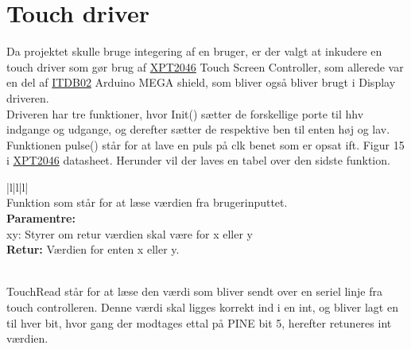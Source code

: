 \graphicspath{{Chapters/Touch/}}


\section{Touch driver}
Da projektet skulle bruge integering af en bruger, er der valgt at inkudere en touch driver som gør brug af \href{https://blackboard.au.dk/bbcswebdav/pid-1762166-dt-content-rid-4251461_1/courses/BB-Cou-UUVA-73302/BB-Cou-UUVA-65758_ImportedContent_20170106021228/BB-Cou-STADS-UUVA-52360_ImportedContent_20160107025559/LAB/LAB10%20Touch%20Screen%20Driver/Files%20for%20LAB10/XPT2046.pdf}{XPT2046}
Touch Screen Controller, som allerede var en del af \href{https://blackboard.au.dk/bbcswebdav/pid-1762173-dt-content-rid-4251448_1/courses/BB-Cou-UUVA-73302/BB-Cou-UUVA-65758_ImportedContent_20170106021228/BB-Cou-STADS-UUVA-52360_ImportedContent_20160107025559/LAB/LAB10%20Touch%20Screen%20Driver/Files%20for%20LAB10/DS_IM120417024_ITDB02ArduinoMEGAShield.pdf}{ITDB02}
Arduino MEGA shield, som bliver også bliver brugt i Display driveren. \\
Driveren har tre funktioner, hvor Init() sætter de forskellige porte til hhv indgange og udgange, og derefter sætter de respektive ben til enten høj og lav. Funktionen pulse() står for at lave en puls på clk benet som er opsat ift. Figur 15 i \href{https://blackboard.au.dk/bbcswebdav/pid-1762166-dt-content-rid-4251461_1/courses/BB-Cou-UUVA-73302/BB-Cou-UUVA-65758_ImportedContent_20170106021228/BB-Cou-STADS-UUVA-52360_ImportedContent_20160107025559/LAB/LAB10%20Touch%20Screen%20Driver/Files%20for%20LAB10/XPT2046.pdf}{XPT2046}
datasheet. 
Herunder vil der laves en tabel over den sidste funktion. 

\begin{center}
\begin{tabular}{ |l|l|l| }
\hline
{} \\
\hline
Funktion som står for at læse værdien fra brugerinputtet.\\
\hline
\textbf{Paramentre:}  \\ xy: Styrer om retur værdien skal være for x eller y \\
\textbf{Retur:} Værdien for enten x eller y. \\
\\

\hline
\end{tabular}
\end{center}  

TouchRead står for at læse den værdi som bliver sendt over en seriel linje fra touch controlleren. Denne værdi skal ligges korrekt ind i en int, og bliver lagt en til hver bit, hvor gang der modtages ettal på PINE bit 5, herefter retuneres int værdien. 